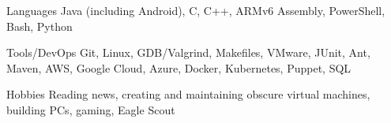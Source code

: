 

\begin{cvskills}


  \cvskill
    {Languages} %
    {Java (including Android), C, C++, ARMv6 Assembly, PowerShell, Bash, Python} %
    
  \cvskill
    {Tools/DevOps} %
    {Git, Linux, GDB/Valgrind, Makefiles, VMware, JUnit, Ant, Maven, AWS, Google Cloud, Azure, Docker, Kubernetes, Puppet, SQL} %

  \cvskill
  {Hobbies} %
  {Reading news, creating and maintaining obscure virtual machines, building PCs, gaming, Eagle Scout} %

\end{cvskills}
